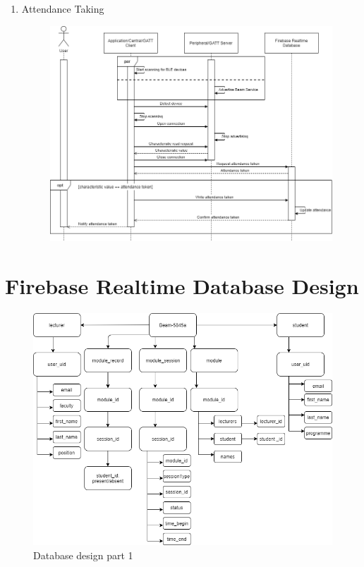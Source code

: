 \documentclass[../report.tex]{subfiles}
\begin{document}
\begin{enumerate}
\begin{figure}[H]
\label{fig:app-login-seq}
\end{figure}
\item Attendance Taking\\
\begin{figure}[H]
\centering
\includegraphics[width=\textwidth]{./images/05-07-app-attendance.png}
\label{fig:app-attendance-seq}
\end{figure}
\end{enumerate}

\section{Firebase Realtime Database Design}
\begin{figure}[H]
\centering
\includegraphics[width=\textwidth]{./images/05-08-database-1.png}
\caption{Database design part 1}
\label{fig:database-design-1}
\end{figure}
\end{document}
